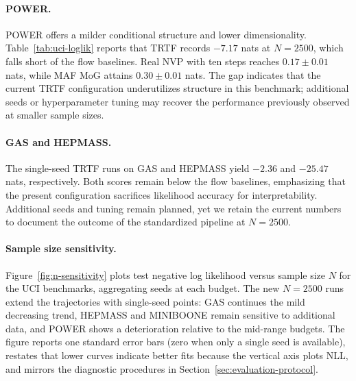 \documentclass[11pt,a4paper,twoside]{book}\usepackage[]{graphicx}\usepackage[]{xcolor}
\begin{document}
\paragraph{POWER.} POWER offers a milder conditional structure and lower dimensionality. Table~\ref{tab:uci-loglik} reports that TRTF records $-7.17$ nats at $N=2500$, which falls short of the flow baselines. Real NVP with ten steps reaches $0.17 \pm 0.01$ nats, while MAF MoG attains $0.30 \pm 0.01$ nats. The gap indicates that the current TRTF configuration underutilizes structure in this benchmark; additional seeds or hyperparameter tuning may recover the performance previously observed at smaller sample sizes.

\paragraph{GAS and HEPMASS.} The single-seed TRTF runs on GAS and HEPMASS yield $-2.36$ and $-25.47$ nats, respectively. Both scores remain below the flow baselines, emphasizing that the present configuration sacrifices likelihood accuracy for interpretability. Additional seeds and tuning remain planned, yet we retain the current numbers to document the outcome of the standardized pipeline at $N=2500$.

\paragraph{Sample size sensitivity.} Figure~\ref{fig:n-sensitivity} plots test negative log likelihood versus sample size $N$ for the UCI benchmarks, aggregating seeds at each budget. The new $N=2500$ runs extend the trajectories with single-seed points: GAS continues the mild decreasing trend, HEPMASS and MINIBOONE remain sensitive to additional data, and POWER shows a deterioration relative to the mid-range budgets. The figure reports one standard error bars (zero when only a single seed is available), restates that lower curves indicate better fits because the vertical axis plots NLL, and mirrors the diagnostic procedures in Section~\ref{sec:evaluation-protocol}.
\end{document}
